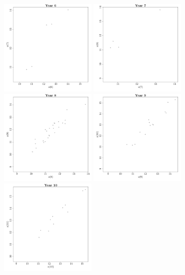 \documentclass{article}\usepackage[]{graphicx}\usepackage[]{color}
\newenvironment{knitrout}{}{} %
\begin{document}
\begin{knitrout}
\includegraphics[width=0.35\textwidth]{figure/Reshaping6} 
\includegraphics[width=0.35\textwidth]{figure/Reshaping7} 
\includegraphics[width=0.35\textwidth]{figure/Reshaping8} 
\includegraphics[width=0.35\textwidth]{figure/Reshaping9} 
\includegraphics[width=0.35\textwidth]{figure/Reshaping10} 

\end{knitrout}
\end{document}

